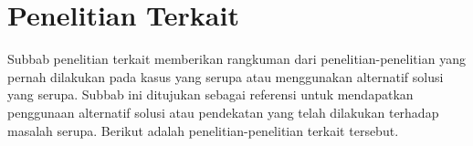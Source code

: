 \section{Penelitian Terkait}
\label{sec:penelitian-terkait}

Subbab penelitian terkait memberikan rangkuman dari penelitian-penelitian yang pernah dilakukan pada kasus yang serupa atau menggunakan alternatif solusi yang serupa. Subbab ini ditujukan sebagai referensi untuk mendapatkan penggunaan alternatif solusi atau pendekatan yang telah dilakukan  terhadap masalah serupa. Berikut adalah penelitian-penelitian terkait tersebut. 




